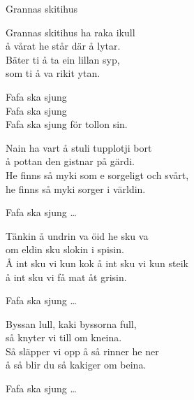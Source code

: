 \begin{song}{Grannas skitihus}
	
	

    \showversenumber	
	Grannas skitihus ha raka ikull\\
	å vårat he står där å lytar.\\
	Bäter ti å ta ein lillan syp,\\
	som ti å va rikit ytan.
	
	Fafa ska sjung\\
	Fafa ska sjung\\
	Fafa ska sjung för tollon sin.
	
    \showversenumber
	Nain ha vart å stuli tupplotji bort\\
	å pottan den gistnar på gärdi.\\
	He finns så myki som e sorgeligt och svårt,\\
	he finns så myki sorger i världin.
	
	Fafa ska sjung \ldots{}
	
    \showversenumber
	Tänkin å undrin va öid he sku va\\
	om eldin sku slokin i spisin.\\
	Å int sku vi kun kok å int sku vi kun steik\\
	å int sku vi få mat åt grisin.
	
	Fafa ska sjung \ldots{}
	
    \showversenumber
	Byssan lull, kaki byssorna full,\\
	så knyter vi till om kneina.\\
	Så släpper vi opp å så rinner he ner\\
	å så blir du så kakiger om beina.
	
	Fafa ska sjung \ldots{}
	
\end{song}
